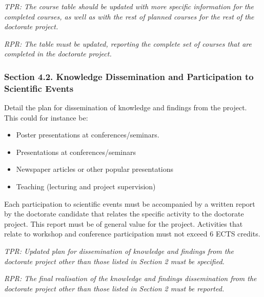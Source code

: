 \documentclass[12pt]{article}
\begin{document}
\begin{shaded}
\noindent
\emph{TPR: The course table should be updated with more specific information for the completed courses, as well as with the rest of planned courses for the rest of the doctorate project.}

\noindent
\emph{RPR: The table must be updated, reporting the complete set of courses that are completed in the doctorate project.}
\end{shaded}

\subsubsection*{Section 4.2. Knowledge Dissemination and Participation to Scientific Events}

Detail the plan for dissemination of knowledge and findings from the project.\\

This could for instance be:
\begin{itemize}
\item Poster presentations at conferences/seminars.
\item Presentations at conferences/seminars
\item Newspaper articles or other popular presentations
\item Teaching (lecturing and project supervision)
\end{itemize}



Each participation to scientific events must be accompanied by a written report by the doctorate candidate that relates the specific activity to the doctorate project. This report must be of general value for the project. Activities that relate to workshop and conference participation must not exceed 6 ECTS credits.

\begin{shaded}
\noindent
\emph{TPR: Updated plan for dissemination of knowledge and findings from the doctorate project other than those listed in Section 2 must be specified. }

\noindent
\emph{RPR: The final realisation of the knowledge and findings dissemination from the doctorate project other than those listed in Section 2 must be reported. }
\end{shaded}
\end{document}
